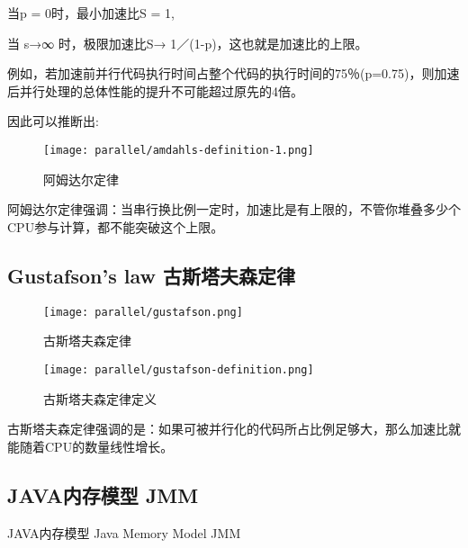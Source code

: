 当p = 0时，最小加速比S = 1,

当 s→∞ 时，极限加速比S→ 1／(1-p)，这也就是加速比的上限。

例如，若加速前并行代码执行时间占整个代码的执行时间的75％(p=0.75)，则加速后并行处理的总体性能的提升不可能超过原先的4倍。

因此可以推断出:

 \begin{figure}[H]
    \centering
    \texttt{[image: parallel/amdahls-definition-1.png]}
    \caption{阿姆达尔定律}
\end{figure}

阿姆达尔定律强调：当串行换比例一定时，加速比是有上限的，不管你堆叠多少个CPU参与计算，都不能突破这个上限。


\subsection{Gustafson's law 古斯塔夫森定律}


 \begin{figure}[H]
    \centering
    \texttt{[image: parallel/gustafson.png]}
    \caption{古斯塔夫森定律}
\end{figure}

 \begin{figure}[H]
    \centering
    \texttt{[image: parallel/gustafson-definition.png]}
    \caption{古斯塔夫森定律定义}
\end{figure}

古斯塔夫森定律强调的是：如果可被并行化的代码所占比例足够大，那么加速比就能随着CPU的数量线性增长。



\subsection{JAVA内存模型 JMM}

JAVA内存模型 Java Memory Model JMM













